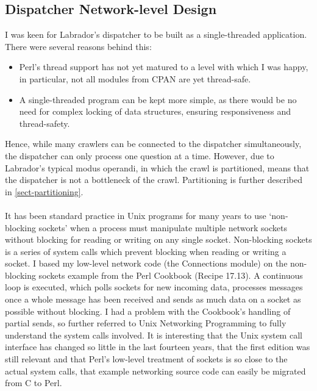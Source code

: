 \subsection{Dispatcher Network-level Design}\label{sect-dispnetworkdesign}
I was keen for Labrador's dispatcher to be built as a single-threaded application. There were several reasons behind this: 
\begin{itemize}
\item{Perl's thread support has not yet matured to a level with which I was happy, in particular, not all modules from CPAN are yet thread-safe.}
\item{A single-threaded program can be kept more simple, as there would be no need for complex locking of data structures, ensuring responsiveness and thread-safety.} 
\end{itemize}
Hence, while many crawlers can be connected to the dispatcher simultaneously, the dispatcher can only process one question at a time. However, due to Labrador's typical modus operandi, in which the crawl is partitioned, means that the dispatcher is not a bottleneck of the crawl. Partitioning is further described in \ref{sect-partitioning}.\\
\ \\
It has been standard practice in Unix programs for many years to use `non-blocking sockets' when a process must manipulate multiple network sockets without blocking for reading or writing on any single socket. Non-blocking sockets is a series of system calls which prevent blocking when reading or writing a socket. I based my low-level network code (the Connections module) on the non-blocking sockets example from the Perl Cookbook\cite{book1} (Recipe 17.13). A continuous loop is executed, which polls sockets for new incoming data, processes messages once a whole message has been received and sends as much data on a socket as possible without blocking. I had a problem with the Cookbook's handling of partial sends, so further referred to Unix Networking Programming\cite{book2} to fully understand the system calls involved. It is interesting that the Unix system call interface has changed so little in the last fourteen years, that the first edition was still relevant and that Perl's low-level treatment of sockets is so close to the actual system calls, that example networking source code can easily be migrated from C to Perl.

